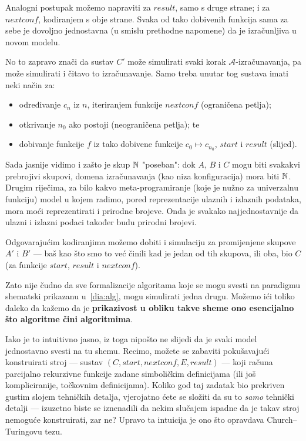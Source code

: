 Analogni postupak možemo napraviti za $result$, samo s druge strane; i za $nextconf$, kodiranjem s obje strane. Svaka od tako dobivenih funkcija sama za sebe je dovoljno jednostavna (u smislu prethodne napomene) da je iz\-ra\-čun\-lji\-va u novom modelu.

No to zapravo znači da sustav $C'$ može simulirati svaki korak $\mathcal A$-izračunavanja, pa može simulirati i čitavo to izračunavanje. Samo treba unutar tog sustava imati neki način za:
\begin{itemize}
    \item određivanje $c_n$ iz $n$, iteriranjem funkcije $nextconf$ (ograničena petlja);
    \item otkrivanje $n_0$ ako postoji (neograničena petlja); te
    \item dobivanje funkcije $f$ iz tako dobivene funkcije $c_0\mapsto c_{n_0}$, $start$ i $result$ (slijed).
\end{itemize}

Sada jasnije vidimo i zašto je skup ${\mathbb N}$ "poseban": dok $A$, $B$ i $C$ mogu biti svakakvi prebrojivi skupovi, domena izračunavanja (kao niza konfiguracija) mora biti ${\mathbb N}$. Drugim riječima, za bilo kakvo meta-programiranje (koje je nužno za univerzalnu funkciju) model u kojem radimo, pored reprezentacije ulaznih i izlaznih podataka, mora moći reprezentirati i prirodne brojeve. Onda je svakako najjednostavnije da ulazni i izlazni podaci također budu prirodni brojevi.

Odgovarajućim kodiranjima možemo dobiti i simulaciju za promijenjene skupove $A'$ i $B'$ --- baš kao što smo to već činili kad je jedan od tih skupova, ili oba, bio $C$ (za funkcije $start$, $result$ i $nextconf$).

Zato nije čudno da sve formalizacije algoritama koje se mogu svesti na paradigmu shematski prikazanu u~\eqref{dia:alg}, mogu simulirati jedna drugu. Možemo ići toliko daleko da kažemo da je \textbf{prikazivost u obliku takve sheme ono esencijalno što algoritme čini algoritmima}.

Iako je to intuitivno jasno, iz toga nipošto ne slijedi da je svaki model jednostavno svesti na tu shemu. Recimo, možete se zabaviti pokušavajući konstruirati stroj --- sustav $(C,start,nextconf,E,result)$ --- koji računa parcijalno rekurzivne funkcije zadane simboličkim definicijama (ili još kompliciranije, točkovnim definicijama). Koliko god taj zadatak bio prekriven gustim slojem tehničkih detalja, vjerojatno ćete se složiti da su to \emph{samo} tehnički detalji --- izuzetno biste se iznenadili da nekim slučajem ispadne da je takav stroj nemoguće konstruirati, zar ne? Upravo ta intuicija je ono što opravdava Church--\!Turingovu tezu.

